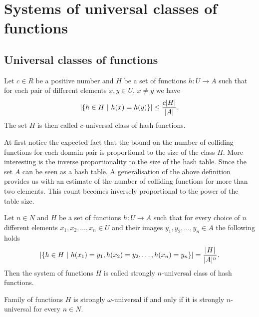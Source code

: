 \chapter{Systems of universal classes of functions}

\section{Universal classes of functions}

\begin{definition}
\label{c_universal_system}
Let $c \in R$ be a positive number and $H$ be a set of functions $h: U \rightarrow A$ such that for each pair of different elements $x, y \in U$, $x \neq y$ we have \[ \left| \lbrace h \in H \ | \  h(x) = h(y) \rbrace \right| \leq \frac {c |H|}{|A|} \textit{.} \] The set $H$ is then called $c$-universal class of hash functions.
\end{definition}

At first notice the expected fact that the bound on the number of colliding functions for each domain pair is proportional to the size of the class $H$. More interesting is the inverse proportionality to the size of the hash table. Since the set $A$ can be seen as a hash table. A generalisation of the above definition provides us with an estimate of the number of colliding functions for more than two elements. This count becomes inversely proportional to the power of the table size.

\begin{definition}
\label{strong_universal_n_system}
Let $n \in N$ and $H$ be a set of functions $h: U \rightarrow A$ such that for every choice of $n$ different elements $x_1, x_2, \dots, x_n \in U$ and their images $y_1, y_2, \dots, y_n \in A$ the following holds \[ \left|\lbrace h \in H \ | \  h(x_1) = y_1, h(x_2) = y_2, \dots, h(x_n) = y_n \rbrace \right| = \frac{|H|}{|A|^n} \textit{.} \] Then the system of functions $H$ is called strongly $n$-universal class of hash functions.
\end{definition}

\begin{definition}
\label{strong_universal_omega_system}
Family of functions $H$ is strongly $\omega$-universal if and only if it is strongly $n$-universal for every $n \in N$.
\end{definition}

